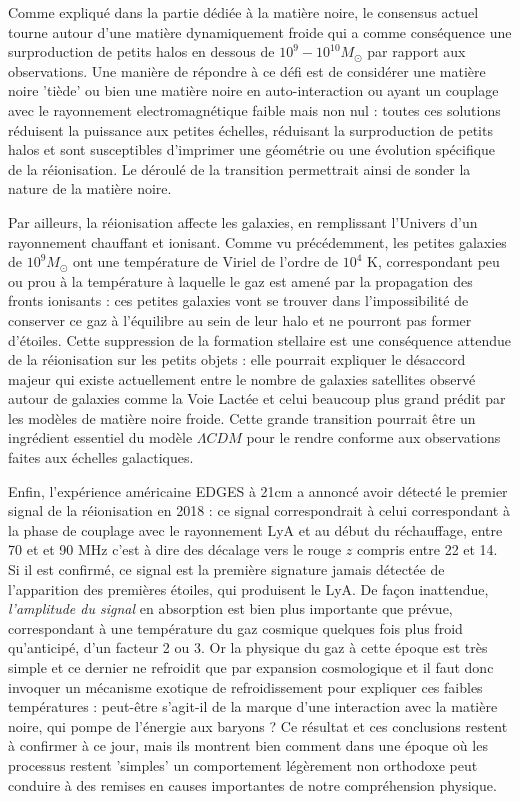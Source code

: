 Comme expliqué dans la partie dédiée à la matière noire, le consensus actuel tourne autour d'une matière dynamiquement froide qui a comme conséquence une surproduction de petits halos en dessous de $10^9-10^10 M_\odot$ par rapport aux observations. Une manière de répondre à ce défi est de considérer une matière noire 'tiède' ou bien une matière noire en auto-interaction ou ayant un couplage avec le rayonnement electromagnétique faible mais non nul : toutes ces solutions réduisent la puissance aux petites échelles, réduisant la surproduction de petits halos et sont susceptibles d'imprimer une géométrie ou une évolution spécifique de la réionisation. Le déroulé de la transition permettrait ainsi de sonder la nature de la matière noire.

Par ailleurs, la réionisation affecte les galaxies, en remplissant l'Univers d'un rayonnement chauffant et ionisant. Comme vu précédemment, les petites galaxies de $10^9 M_\odot$ ont une température de Viriel de l'ordre de $10^4$ K, correspondant peu ou prou à la température à laquelle le gaz est amené par la propagation des fronts ionisants : ces petites galaxies vont se trouver dans l'impossibilité de conserver ce gaz à l'équilibre au sein de leur halo et ne pourront pas former d'étoiles. Cette suppression de la formation stellaire est une conséquence attendue de la réionisation sur les petits objets : elle pourrait expliquer le désaccord majeur qui existe actuellement entre le nombre de galaxies satellites observé autour de galaxies comme la Voie Lactée et celui beaucoup plus grand prédit par les modèles de matière noire froide. Cette grande transition pourrait être un ingrédient essentiel du modèle $\Lambda CDM$ pour le rendre conforme aux observations faites aux échelles galactiques.

Enfin, l'expérience américaine EDGES à 21cm a annoncé avoir détecté le premier signal de la réionisation en 2018 : ce signal correspondrait à celui correspondant à la phase de couplage avec le rayonnement LyA et au début du réchauffage, entre 70 et et 90 MHz c'est à dire des décalage vers le rouge $z$ compris entre 22 et 14. Si il est confirmé, ce signal est la première signature jamais détectée de l'apparition des premières étoiles, qui produisent le LyA. De façon inattendue, \textit{l'amplitude du signal} en absorption est bien plus importante que prévue, correspondant à une température du gaz cosmique quelques fois plus froid qu'anticipé, d'un facteur 2 ou 3. Or la physique du gaz à cette époque est très simple et ce dernier ne refroidit que par expansion cosmologique et il faut donc invoquer un mécanisme exotique de refroidissement pour expliquer ces faibles températures : peut-être s'agit-il de la marque d'une interaction avec la matière noire, qui pompe de l'énergie aux baryons ? Ce résultat et ces conclusions restent à confirmer à ce jour, mais ils montrent bien comment dans une époque où les processus restent 'simples' un comportement légèrement non orthodoxe peut conduire à des remises en causes importantes de notre compréhension physique.  
  
 